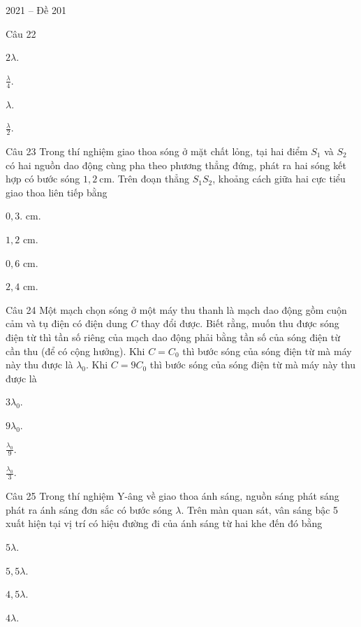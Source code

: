 \documentclass{book}
\begin{document}
\begin{quiz}{2021 – Đề 201}
\begin{multi}[points=1]{Câu 22}
\item  $2\lambda $.	
\item  $\frac{\lambda }{4}$.	
\item  $\lambda $.	
\item*  $\frac{\lambda }{2}$.
\end{multi}

\begin{multi}[points=1]{Câu 23}
 Trong thí nghiệm giao thoa sóng ở mặt chất lỏng, tại hai điểm ${{S}_{1}}$ và ${{S}_{2}}$ có hai nguồn dao động cùng pha theo phương thẳng đứng, phát ra hai sóng kết hợp có bước sóng $1,2~\text{cm}$. Trên đoạn thẳng ${{S}_{1}}{{S}_{2}}$, khoảng cách giữa hai cực tiểu giao thoa liên tiếp bằng

\item  $0,3$.  cm.	
\item  $1,2$ cm.	
\item*  $0,6$ cm.	
\item  $2,4$ cm.
\end{multi}

\begin{multi}[points=1]{Câu 24}
 Một mạch chọn sóng ở một máy thu thanh là mạch dao động gồm cuộn cảm và tụ điện có điện dung $C$ thay đổi được. Biết rằng, muốn thu được sóng điện từ thì tần số riêng của mạch dao động phải bằng tần số của sóng điện từ cần thu (để có cộng hưởng). Khi $C={{C}_{0}}$ thì bước sóng của sóng điện từ mà máy này thu được là ${{\lambda }_{0}}$. Khi $C=9{{C}_{0}}$ thì bước sóng của sóng điện từ mà máy này thu được là

\item*  $3{{\lambda }_{0}}$.	
\item  $9{{\lambda }_{0}}$.	
\item  $\frac{{{\lambda }_{0}}}{9}$.	
\item  $\frac{{{\lambda }_{0}}}{3}$.
\end{multi}

\begin{multi}[points=1]{Câu 25}
 Trong thí nghiệm Y-âng về giao thoa ánh sáng, nguồn sáng phát sáng phát ra ánh sáng đơn sắc có bước sóng $\lambda $. Trên màn quan sát, vân sáng bậc 5 xuất hiện tại vị trí có hiệu đường đi của ánh sáng từ hai khe đến đó bằng

\item*  $5\lambda $.	
\item  $5,5\lambda $.	
\item  $4,5\lambda $.	
\item  $4\lambda $.
\end{multi}


\end{quiz}
\end{document}
